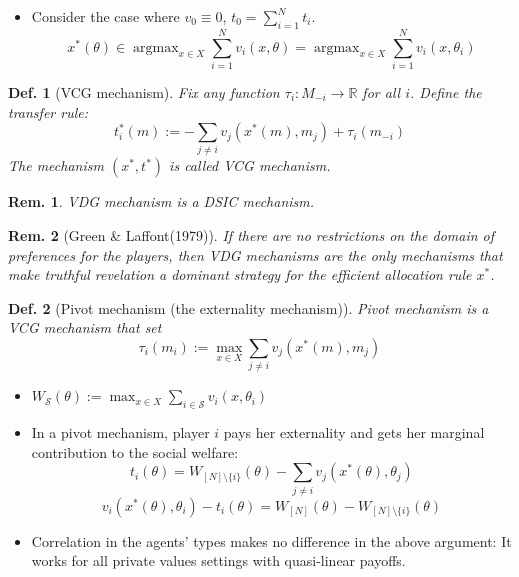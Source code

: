 \documentclass[11pt,a4paper,dvipdfmx]{article}
\theoremstyle{plain}
\newtheorem{df}{Def.}[section]
\newtheorem{rem}{Rem.}[section]
\newcommand{\R}{\mathbb{R}}
\newcommand{\mS}{\mathcal{S}}
\newcommand{\1}{\mathbbm{1}}
\DeclareMathOperator*{\argmax}{argmax}
\begin{document}
\begin{itemize}
	\item Consider the case where $v_0 \equiv 0$, $t_0 = \sum_{i=1}^N t_i$.
	\[
	x^*(\theta) \in \argmax_{x \in X}\sum_{i=1}^N v_i(x, \theta)
	= \argmax_{x \in X}\sum_{i=1}^N v_i(x, \theta_i)
	\]
\end{itemize}
\begin{df}[VCG mechanism]
	Fix any function $\tau_i: M_{-i} \to \R$ for all $i$. Define the transfer rule:
	\[
	t^*_i(m) := - \sum_{j \neq i} v_j(x^*(m), m_j) + \tau_i(m_{-i})
	\]
	The mechanism $(x^*, t^*)$ is called VCG mechanism.
\end{df}
\begin{rem}
	VDG mechanism is a DSIC mechanism.
\end{rem}
\begin{rem}[Green \& Laffont(1979)]
	If there are no restrictions on the domain of preferences for the players, then VDG mechanisms are the only mechanisms that make truthful revelation a dominant strategy for the efficient allocation rule $x^*$.
\end{rem}

\begin{df}[Pivot mechanism (the externality mechanism)]
	Pivot mechanism is a VCG mechanism that set 
	\[
	\tau_i(m_i) := \max_{x \in X} \sum_{j \neq i} v_j(x^*(m), m_j)
	\]
\end{df}
\begin{itemize}
	\item $W_{\mS}(\theta) := \max_{x \in X} \sum_{i \in \mS}v_i(x, \theta_i)$
	\item In a pivot mechanism, player $i$ pays her externality and gets her marginal contribution to the social welfare:
	\[
	t_i(\theta) = W_{[N] \setminus \{i\}}(\theta) - \sum_{j \neq i} v_j(x^*(\theta), \theta_j)
	\]
	\[
	v_i(x^*(\theta), \theta_i) - t_i(\theta) = W_{[N]}(\theta) - W_{[N] \setminus \{i\}}(\theta)
	\]
	\item Correlation in the agents' types makes no difference in the above argument: It works for all private values settings with quasi-linear payoffs.
\end{itemize}
\end{document}
